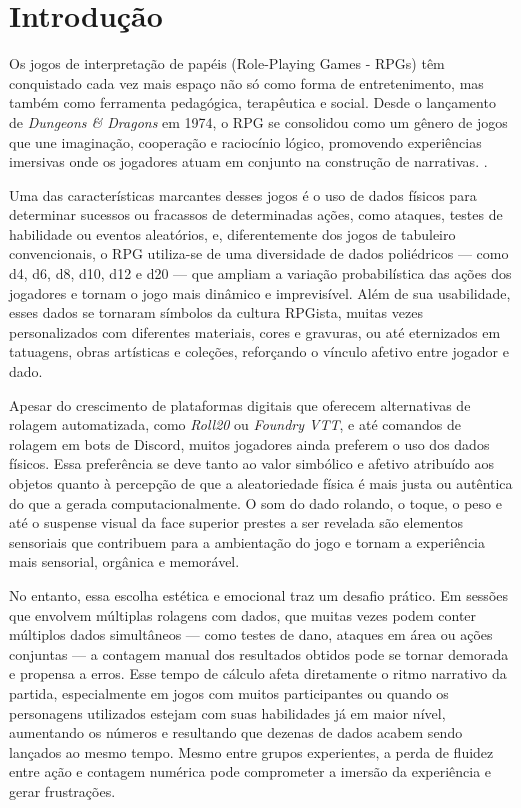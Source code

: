 \section{Introdução}

Os jogos de interpretação de papéis (Role-Playing Games - RPGs) têm conquistado cada vez mais espaço não só 
como forma de entretenimento, mas também como ferramenta pedagógica, terapêutica e social. Desde o lançamento
de \textit{Dungeons \& Dragons} em 1974, o RPG se consolidou como um gênero de jogos que une imaginação, 
cooperação e raciocínio lógico, promovendo experiências imersivas onde os jogadores atuam em conjunto na 
construção de narrativas.  \cite{peterson2012playing} \cite{hitchens2007roleplaying}.

Uma das características marcantes desses jogos é o uso de dados físicos para determinar sucessos ou fracassos
de determinadas ações, como ataques, testes de habilidade ou eventos aleatórios, e, diferentemente dos jogos 
de tabuleiro convencionais, o RPG utiliza-se de uma diversidade de dados poliédricos 
— como d4, d6, d8, d10, d12 e d20 — que ampliam a variação probabilística das ações dos jogadores e tornam 
o jogo mais dinâmico e imprevisível. Além de sua usabilidade, esses dados se tornaram símbolos da cultura 
RPGista, muitas vezes personalizados com diferentes materiais, cores e gravuras, ou até eternizados em tatuagens, 
obras artísticas e coleções, reforçando o vínculo afetivo entre jogador e dado.

Apesar do crescimento de plataformas digitais que oferecem alternativas de rolagem automatizada, como
\textit{Roll20} ou \textit{Foundry VTT}, e até comandos de rolagem em bots de Discord, muitos jogadores ainda
preferem o uso dos dados físicos. Essa preferência se deve tanto ao valor simbólico e afetivo atribuído aos
objetos quanto à percepção de que a aleatoriedade física é mais justa ou autêntica do que a gerada 
computacionalmente. O som do dado rolando, o toque, o peso e até o suspense visual da face superior prestes a 
ser revelada são elementos sensoriais que contribuem para a ambientação do jogo e tornam a experiência 
mais sensorial, orgânica e memorável.

No entanto, essa escolha estética e emocional traz um desafio prático. Em sessões que envolvem múltiplas
rolagens com dados, que muitas vezes podem conter múltiplos dados simultâneos — como testes de dano, ataques 
em área ou ações conjuntas — a contagem manual dos resultados obtidos pode se tornar demorada e propensa a erros. 
Esse tempo de cálculo afeta diretamente o ritmo narrativo da partida, especialmente em jogos com muitos 
participantes ou quando os personagens utilizados estejam com suas habilidades já em maior nível, aumentando
os números e resultando que dezenas de dados acabem sendo lançados ao mesmo tempo. Mesmo entre grupos experientes, 
a perda de fluidez entre ação e contagem numérica pode comprometer a imersão da experiência e gerar frustrações.

